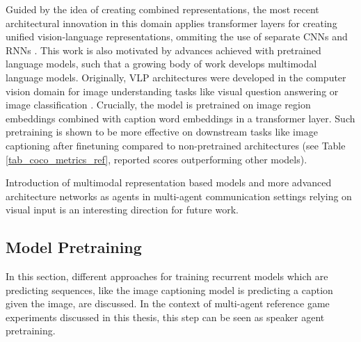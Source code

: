 Guided by the idea of creating combined representations, the most recent architectural innovation in this domain applies transformer layers for creating unified vision-language representations, ommiting the use of separate CNNs and RNNs \parencite{vaswani2017attention, zhou2019unified}. This work is also motivated by advances achieved with pretrained language models, such that a growing body of work develops multimodal language models. 
Originally, VLP  architectures were developed in the computer vision domain for image understanding tasks like visual question answering or image classification \parencite{zhou2019unified}.  Crucially, the model is pretrained on image region embeddings combined with caption word embeddings in a transformer layer. Such pretraining is shown to be more effective on downstream tasks like image captioning after finetuning compared to non-pretrained architectures (see Table \ref{tab_coco_metrics_ref}, reported scores outperforming other models). 

Introduction of multimodal representation based models and more advanced architecture networks as agents in multi-agent communication settings relying on visual input is an interesting direction for future work. 

\subsection{Model Pretraining}

In this section, different approaches for training recurrent models which are predicting sequences, like the image captioning model is predicting a caption given the image, are discussed. In the context of multi-agent reference game experiments discussed in this thesis, this step can be seen as speaker agent pretraining.

